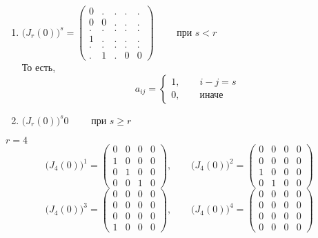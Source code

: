 \begin{props}
	\item
	\begin{enumerate}
		\item $ \bigg( J_r(0) \bigg)^s =
		\begin{pmatrix}
			0 & . & . & . & . \\
			0 & 0 & . & . & . \\
			. & . & . & . & . \\
			1 & . & . & . & . \\
			. & . & . & . & . \\
			. & 1 & . & 0 & 0
		\end{pmatrix} \qquad $ при $ s < r $ \\
		То есть,
		$$ a_{ij} =
		\begin{cases}
			1, \qquad i - j = s \\
			0, \qquad \text{иначе}
		\end{cases} $$
		\item $ \bigg( J_r(0) \bigg)^s 0 \qquad $ при $ s \ge r $
	\end{enumerate}
	\begin{eg}
		$ r = 4 $
		$$ \bigg( J_4(0) \bigg)^1 =
		\begin{pmatrix}
			0 & 0 & 0 & 0 \\
			1 & 0 & 0 & 0 \\
			0 & 1 & 0 & 0 \\
			0 & 0 & 1 & 0
		\end{pmatrix}, \qquad \bigg( J_4(0) \bigg)^2 =
		\begin{pmatrix}
			0 & 0 & 0 & 0 \\
			0 & 0 & 0 & 0 \\
			1 & 0 & 0 & 0 \\
			0 & 1 & 0 & 0
		\end{pmatrix} $$
		$$ \bigg( J_4(0) \bigg)^3 =
		\begin{pmatrix}
			0 & 0 & 0 & 0 \\
			0 & 0 & 0 & 0 \\
			0 & 0 & 0 & 0 \\
			1 & 0 & 0 & 0
		\end{pmatrix}, \qquad \bigg( J_4(0) \bigg)^4 =
		\begin{pmatrix}
			0 & 0 & 0 & 0 \\
			0 & 0 & 0 & 0 \\
			0 & 0 & 0 & 0 \\
			0 & 0 & 0 & 0
		\end{pmatrix} $$

\end{eg}
\end{props}
